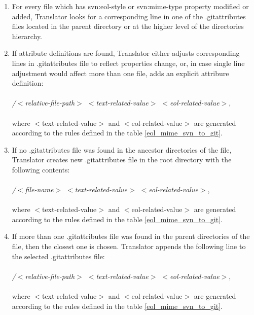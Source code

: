 \begin{enumerate}
\compactlist
\item For every file which has svn:eol-style or svn:mime-type property modified or added, Translator looks for a corresponding line in one of the .gitattributes files located in the parent directory or at the higher level of the directories hierarchy.\\
	
\item If attribute definitions are found, Translator either adjusts corresponding lines in .gitattributes file to reflect properties change, 
or, in case single line adjustment would affect more than one file, adds an explicit attribure definition:\\\\
\emph{/$<$relative-file-path$>$ $<$text-related-value$>$ $<$eol-related-value$>$},\\\\
where $<$text-related-value$>$ and $<$eol-related-value$>$ are generated according to the rules defined in the table \ref{eol_mime_svn_to_git}.\\
	
\item If no .gitattributes file was found in the ancestor directories of the file, Translator creates new .gitattributes file in the root directory with the following contents:\\\\
\emph{/$<$file-name$>$ $<$text-related-value$>$ $<$eol-related-value$>$},\\\\
where $<$text-related-value$>$ and $<$eol-related-value$>$ are generated according to the rules defined in the table \ref{eol_mime_svn_to_git}.\\
	
\item If more than one .gitattributes file was found in the parent directories of the file, then the closest one is chosen. 
Translator appends the following line to the selected .gitattributes file:\\\\
\emph{/$<$relative-file-path$>$ $<$text-related-value$>$ $<$eol-related-value$>$},\\\\
where $<$text-related-value$>$ and $<$eol-related-value$>$ are generated according to the rules defined in the table \ref{eol_mime_svn_to_git}.\\
\end{enumerate}

